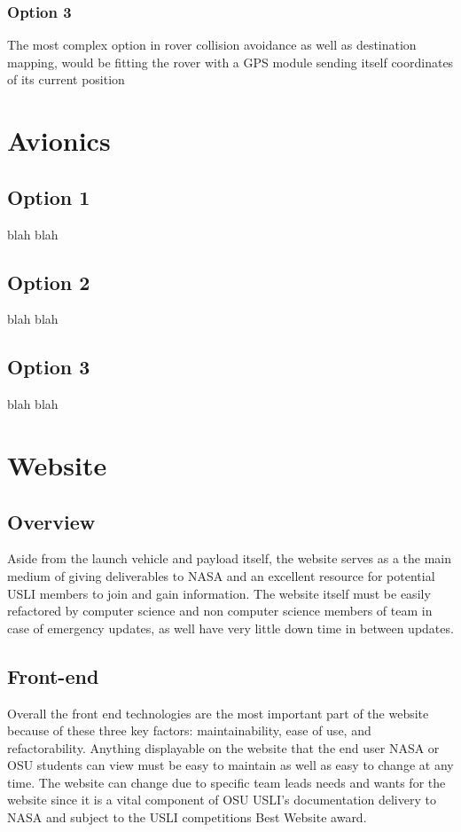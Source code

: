 \documentclass[onecolumn, draftclsnofoot,10pt, compsoc]{IEEEtran}
\begin{document}
    \subsubsection{Option 3}
    The most complex option in rover collision avoidance as well as destination mapping, would be fitting the rover with a GPS module sending itself coordinates of its current position
    
    \section{Avionics}
    \subsection{Option 1}
    blah blah
    \subsection{Option 2}
    blah blah
    \subsection{Option 3}
    blah blah
    
    \section{Website}
    \subsection{Overview}
    Aside from the launch vehicle and payload itself, the website serves as a the main medium of giving deliverables to NASA and an excellent resource for potential USLI members to join and gain information. The website itself must be easily refactored by computer science and non computer science members of team in case of emergency updates, as well have very little down time in between updates. 
    
    \subsection{Front-end}
    Overall the front end technologies are the most important part of the website because of these three key factors: maintainability, ease of use, and refactorability. Anything displayable on the website that the end user NASA or OSU students can view must be easy to maintain  as well as easy to change at any time. The website can change due to specific team leads needs and wants for the website since it is a vital component of OSU USLI's documentation delivery to NASA and subject to the USLI competitions Best Website award. 
\end{document}
